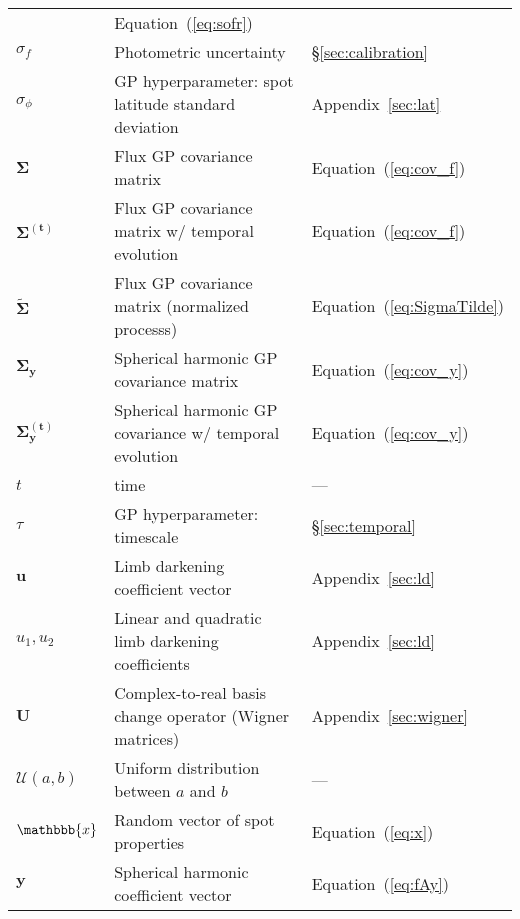 \begin{center}
\begin{longtable}{W{c}{1cm} W{l}{9cm} W{l}{2cm}}
         & Equation~(\ref{eq:sofr})
        \\
        $\sigma_f$
         & Photometric uncertainty
         & \S\ref{sec:calibration}
        \\
        $\sigma_\phi$
         & GP hyperparameter: spot latitude standard deviation
         & Appendix~\ref{sec:lat}
        \\
        $\pmb{\Sigma}$
         & Flux GP covariance matrix
         & Equation~(\ref{eq:cov_f})
        \\
        $\pmb{\Sigma}^\mathbf{(t)}$
         & Flux GP covariance matrix w/ temporal evolution
         & Equation~(\ref{eq:cov_f})
        \\
        $\tilde{\pmb{\Sigma}}$
         & Flux GP covariance matrix (normalized processs)
         & Equation~(\ref{eq:SigmaTilde})
        \\
        $\pmb{\Sigma}_\mathbf{y}$
         & Spherical harmonic GP covariance matrix
         & Equation~(\ref{eq:cov_y})
        \\
        $\pmb{\Sigma}_\mathbf{y}^\mathbf{(t)}$
         & Spherical harmonic GP covariance w/ temporal evolution
         & Equation~(\ref{eq:cov_y})
        \\
        $t$
         & time
         & ---
        \\
        $\tau$
         & GP hyperparameter: timescale
         & \S\ref{sec:temporal}
        \\
        $\mathbf{u}$
         & Limb darkening coefficient vector
         & Appendix~\ref{sec:ld}
        \\
        $u_1, u_2$
         & Linear and quadratic limb darkening coefficients
         & Appendix~\ref{sec:ld}
        \\
        $\mathbf{U}$
         & Complex-to-real basis change operator (Wigner matrices)
         & Appendix~\ref{sec:wigner}
        \\
        $\mathcal{U}(a, b)$
         & Uniform distribution between $a$ and $b$
         & ---
        \\
        $\mathbbb{x}$
         & Random vector of spot properties
         & Equation~(\ref{eq:x})
        \\
        $\mathbf{y}$
         & Spherical harmonic coefficient vector
         & Equation~(\ref{eq:fAy})
        \\

\end{longtable}
\end{center}
